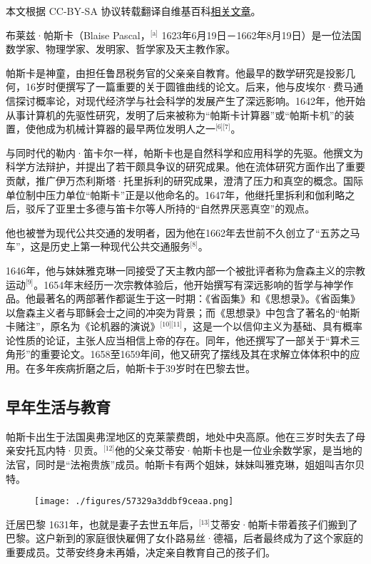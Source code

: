 
本文根据 CC-BY-SA 协议转载翻译自维基百科\href{https://en.wikipedia.org/wiki/Blaise_Pascal}{相关文章}。

布莱兹·帕斯卡（Blaise Pascal，\(^\text{[a]}\) 1623年6月19日－1662年8月19日）是一位法国数学家、物理学家、发明家、哲学家及天主教作家。

帕斯卡是神童，由担任鲁昂税务官的父亲亲自教育。他最早的数学研究是投影几何，16岁时便撰写了一篇重要的关于圆锥曲线的论文。后来，他与皮埃尔·费马通信探讨概率论，对现代经济学与社会科学的发展产生了深远影响。1642年，他开始从事计算机的先驱性研究，发明了后来被称为“帕斯卡计算器”或“帕斯卡机”的装置，使他成为机械计算器的最早两位发明人之一\(^\text{[6][7]}\)。

与同时代的勒内·笛卡尔一样，帕斯卡也是自然科学和应用科学的先驱。他撰文为科学方法辩护，并提出了若干颇具争议的研究成果。他在流体研究方面作出了重要贡献，推广伊万杰利斯塔·托里拆利的研究成果，澄清了压力和真空的概念。国际单位制中压力单位“帕斯卡”正是以他命名的。1647年，他继托里拆利和伽利略之后，驳斥了亚里士多德与笛卡尔等人所持的“自然界厌恶真空”的观点。

他也被誉为现代公共交通的发明者，因为他在1662年去世前不久创立了“五苏之马车”，这是历史上第一种现代公共交通服务\(^\text{[8]}\)。

1646年，他与妹妹雅克琳一同接受了天主教内部一个被批评者称为詹森主义的宗教运动\(^\text{[9]}\)。1654年末经历一次宗教体验后，他开始撰写有深远影响的哲学与神学作品。他最著名的两部著作都诞生于这一时期：《省函集》和《思想录》。《省函集》以詹森主义者与耶稣会士之间的冲突为背景；而《思想录》中包含了著名的“帕斯卡赌注”，原名为《论机器的演说》\(^\text{[10][11]}\)，这是一个以信仰主义为基础、具有概率论性质的论证，主张人应当相信上帝的存在。同年，他还撰写了一部关于“算术三角形”的重要论文。1658至1659年间，他又研究了摆线及其在求解立体体积中的应用。在多年疾病折磨之后，帕斯卡于39岁时在巴黎去世。
\subsection{早年生活与教育}
帕斯卡出生于法国奥弗涅地区的克莱蒙费朗，地处中央高原。他在三岁时失去了母亲安托瓦内特·贝贡。\(^\text{[12]}\)他的父亲艾蒂安·帕斯卡也是一位业余数学家，是当地的法官，同时是“法袍贵族”成员。帕斯卡有两个姐妹，妹妹叫雅克琳，姐姐叫吉尔贝特。
\begin{figure}[ht]
\centering
\texttt{[image: ./figures/57329a3ddbf9ceaa.png]}
\caption{} \label{fig_BLSpsk_1}
\end{figure}
迁居巴黎
1631年，也就是妻子去世五年后，\(^\text{[13]}\)艾蒂安·帕斯卡带着孩子们搬到了巴黎。这户新到的家庭很快雇佣了女仆路易丝·德福，后者最终成为了这个家庭的重要成员。艾蒂安终身未再婚，决定亲自教育自己的孩子们。

